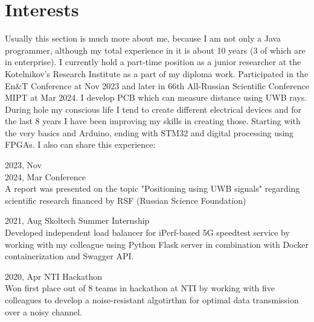 \documentclass[]{cv-style}          %
\begin{document}
\section{Interests}
{\vspace{0.05cm}}
Usually this section is much more about me, because I am not only a Java programmer, although my total experience in it is about 10 years (3 of which are in enterprise).
I currently hold a part-time position as a junior researcher at the Kotelnikov's Research Institute as a part of my diploma work. Participated in the En&T Conference at Nov 2023 and later in 66th All-Russian Scientific Conference MIPT at Mar 2024. I develop PCB which can measure distance using UWB rays. During hole my conscious life I tend to create different electrical devices and for the last 8 years I have been improving my skills in creating those. Starting with the very basics and Arduino, ending with STM32 and digital processing using FPGAs.
I also can share this experience:

\begin{entrylist}

\entrySkoltech
{2023, Nov\\2024, Mar}
{ Conference}
{
\\
A report was presented on the topic "Positioning using UWB signals" regarding scientific research financed by RSF (Russian Science Foundation) 
}


\entrySkoltech
{2021, Aug}
{Skoltech Summer Internship}
{
\\
Developed independent load balancer for iPerf-based 5G speedtest service by working with my colleague using Python Flask server in combination with Docker containerization and Swagger API.
}



\entry
    {2020, Apr}
    {NTI Hackathon}
    {}
    {\\
Won first place out of 8 teams in hackathon at NTI by working with five colleagues to develop a noise-resistant algotirthm for optimal data transmission over a noisy channel.
    }
    
    

\end{entrylist}


\end{document}
